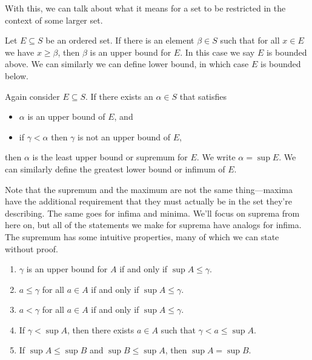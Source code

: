 \documentclass[../m131main.tex]{subfiles}
\begin{document}
With this, we can talk about what it means for a set to be restricted in the context of some larger set.

\begin{definition}
    Let $E \subseteq S$ be an ordered set.
    If there is an element $\beta \in S$ such that for all $x \in E$ we have $x \geq \beta$, then $\beta$ is an upper bound for $E$.
    In this case we say $E$ is bounded above.
    We can similarly we can define lower bound, in which case $E$ is bounded below.
\end{definition}

\begin{definition}
    Again consider $E \subseteq S$.
    If there exists an $\alpha \in S$ that satisfies
    \begin{itemize}
        \item $\alpha$ is an upper bound of $E$, and
        \item if $\gamma < \alpha$ then $\gamma$ is not an upper bound of $E$,
    \end{itemize}
    then $\alpha$ is the least upper bound or supremum for $E$.
    We write $\alpha = \sup E$.
    We can similarly define the greatest lower bound or infimum of $E$.
\end{definition}

Note that the supremum and the maximum are not the same thing---maxima have the additional requirement that they must actually be in the set they're describing.
The same goes for infima and minima.
We'll focus on suprema from here on, but all of the statements we make for suprema have analogs for infima.
The supremum has some intuitive properties, many of which we can state without proof.

\begin{theorem} \label{sup_props}
    \begin{enumerate}[label=(\alph*)]
        \item $\gamma$ is an upper bound for $A$ if and only if $\sup A \leq \gamma$.
        \item $a \leq \gamma$ for all $a \in A$ if and only if $\sup A \leq \gamma$.
        \item $a < \gamma$ for all $a \in A$ if and only if $\sup A \leq \gamma$.
        \item If $\gamma < \sup A$, then there exists $a \in A$ such that $\gamma < a \leq \sup A$.
        \item If $\sup A \leq \sup B$ and $\sup B \leq \sup A$, then $\sup A = \sup B$.
    \end{enumerate}
\end{theorem}
\end{document}
